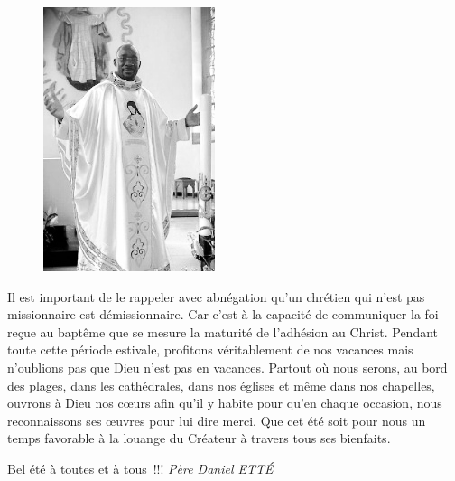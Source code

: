 \begin{figure}
\vspace{-0.4cm}
	\includegraphics[scale=1.20]{../images/standing_daniel}
\end{figure}
Il est important de le rappeler avec abnégation qu’un chrétien qui n’est pas missionnaire est démissionnaire. Car c’est à la capacité de communiquer la foi reçue au baptême que se mesure la maturité de l’adhésion au Christ.
Pendant toute cette période estivale, profitons véritablement de nos vacances mais n’oublions pas que Dieu n’est pas en vacances. Partout où nous serons, au bord des plages, dans les cathédrales, dans nos églises et même dans nos chapelles, ouvrons à Dieu nos cœurs afin qu’il y habite pour qu’en chaque occasion, nous reconnaissons ses œuvres pour lui dire merci. Que cet été soit pour nous un temps favorable à la louange du Créateur à travers tous ses bienfaits.

\begin{flushright}
Bel été à toutes et à tous !!!
\textit{Père  Daniel  ETTÉ}
\end{flushright}

